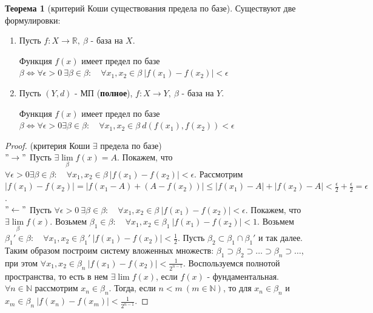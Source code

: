 \documentclass{report}
\theoremstyle{definition}
\newtheorem{theorem}{Теорема}[section]
\begin{document}
\begin{theorem}[критерий Коши существования предела по базе]
  Существуют две формулировки:
  \begin{enumerate}
    \item Пусть $f:X\rightarrow\mathbb{R}, \ \beta$ - база на $X$.

          Функция $f(x)$ имеет предел по базе $\beta \iff \forall \epsilon > 0 \ \exists\beta\in\beta: \quad \forall
            x_{1},x_{2} \in \beta \ |f(x_{1}) - f(x_{2})| < \epsilon$

    \item Пусть $(Y,d)$ - МП (\textbf{полное}), $f:X\rightarrow Y, \ \beta$ - база на $Y$.

          Функция $f(x)$ имеет предел по базе $\beta \iff \forall \epsilon>0\exists\beta\in\beta: \quad \forall
            x_{1},x_{2} \in \beta \ d(f(x_{1}), f(x_{2})) < \epsilon$
  \end{enumerate}
\end{theorem}

\begin{proof}
  (критерия Коши $\exists$ предела по базе)\\

  $"\rightarrow"$ Пусть $\exists \underset{\beta}{\lim}f(x) = A$. Покажем, что $\forall \epsilon > 0 \exists \beta \in
  \beta: \quad \forall x_{1},x_{2} \in \beta \ |f(x_{1}) - f(x_{2})| < \epsilon$. Рассмотрим $| f(x_{1}) - f(x_{2}) |
  = | f(x_{1} - A) + (A - f(x_{2})) | \leqslant | f(x_{1}) - A | + | f(x_{2}) - A | < \frac{\epsilon}{2} +
  \frac{\epsilon}{2} = \epsilon$.\\

  $"\leftarrow"$ Пусть $\forall \epsilon > 0 \ \exists \beta\in\beta: \quad \forall x_{1},x_{2}\in\beta \ | f(x_{1}) -
  f(x_{2}) |<\epsilon$. Покажем, что $\exists \underset{\beta}{\lim}f(x)$. Возьмем $\beta_{1} \in \beta: \quad
  \forall x_{1},x_{2}\in\beta_{1} \ | f(x_{1}) - f(x_{2}) | < 1$. Возьмем $\beta_{1}'\in\beta: \quad \forall
  x_{1},x_{2}\in\beta_{1}' \ | f(x_{1}) - f(x_{2}) | < \frac{1}{2}$. Пусть $\beta_{2} \subset \beta_{1} \cap \beta_{1}'$
  и так далее.\\

  Таким образом построим систему вложенных множеств: $\beta_{1} \supset \beta_{2} \supset \ldots \supset \beta_{n}
  \supset \ldots$, при этом $\forall x_{1},x_{2} \in \beta_{n} \ | f(x_{1}) - f(x_{2}) | < \frac{1}{2^{n-1}}$.
  Воспользуемся полнотой пространства, то есть в нем $\exists \lim f(x)$, если $f(x)$ - фундаментальная.\\

  $\forall n \in \mathbb{N}$ рассмотрим $x_{n} \in \beta_{n}$. Тогда, если $n < m \ (m \in \mathbb{N})$, то
  для $x_{n} \in \beta_{n}$ и $x_{m} \in \beta_{n} \ | f(x_{n}) - f(x_{m}) | < \frac{1}{2^{n-1}}$.


\end{proof}
\end{document}
